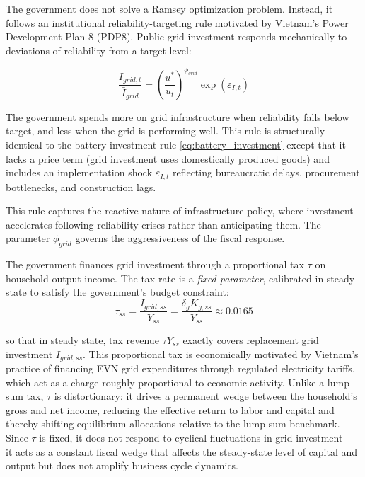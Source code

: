 \documentclass[12pt, a4paper]{article}
\begin{document}
The government does not solve a Ramsey optimization problem. Instead, it follows an institutional reliability-targeting rule motivated by Vietnam's Power Development Plan 8 (PDP8). Public grid investment responds mechanically to deviations of reliability from a target level:

\begin{equation}
\frac{I_{grid,t}}{\bar{I}_{grid}} =
\left(\frac{u^*}{u_t}\right)^{\phi_{grid}}
\exp(\varepsilon_{I,t})
\label{eq:grid_investment_rule}
\end{equation}

The government spends more on grid infrastructure when reliability falls below target, and less when the grid is performing well. This rule is structurally identical to the battery investment rule \eqref{eq:battery_investment} except that it lacks a price term (grid investment uses domestically produced goods) and includes an implementation shock $\varepsilon_{I,t}$ reflecting bureaucratic delays, procurement bottlenecks, and construction lags.

This rule captures the reactive nature of infrastructure policy, where investment accelerates following reliability crises rather than anticipating them. The parameter $\phi_{grid}$ governs the aggressiveness of the fiscal response.

The government finances grid investment through a proportional tax $\tau$ on household output income. The tax rate is a \textit{fixed parameter}, calibrated in steady state to satisfy the government's budget constraint:
\begin{equation}
\tau_{ss} = \frac{I_{grid,ss}}{Y_{ss}} = \frac{\delta_g K_{g,ss}}{Y_{ss}} \approx 0.0165
\label{eq:gov_budget}
\end{equation}

\noindent so that in steady state, tax revenue $\tau Y_{ss}$ exactly covers replacement grid investment $I_{grid,ss}$. This proportional tax is economically motivated by Vietnam's practice of financing EVN grid expenditures through regulated electricity tariffs, which act as a charge roughly proportional to economic activity. Unlike a lump-sum tax, $\tau$ is distortionary: it drives a permanent wedge between the household's gross and net income, reducing the effective return to labor and capital and thereby shifting equilibrium allocations relative to the lump-sum benchmark. Since $\tau$ is fixed, it does not respond to cyclical fluctuations in grid investment --- it acts as a constant fiscal wedge that affects the steady-state level of capital and output but does not amplify business cycle dynamics.
\end{document}
